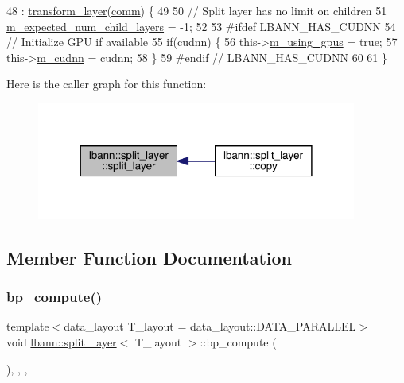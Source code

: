 \begin{DoxyCode}
48     : \hyperlink{classlbann_1_1transform__layer_a4b72501e0f4d0745c8b13c5331055e65}{transform\_layer}(\hyperlink{file__io_8cpp_ab048c6f9fcbcfaa57ce68b00263dbebe}{comm}) \{
49 
50     \textcolor{comment}{// Split layer has no limit on children}
51     \hyperlink{classlbann_1_1Layer_ac08f133dddd150319650e220ab9a523a}{m\_expected\_num\_child\_layers} = -1;
52 
53 \textcolor{preprocessor}{  #ifdef LBANN\_HAS\_CUDNN}
54     \textcolor{comment}{// Initialize GPU if available}
55     \textcolor{keywordflow}{if}(cudnn) \{
56       this->\hyperlink{classlbann_1_1Layer_af7881cb5eff5207c15fa835d65462e8f}{m\_using\_gpus} = \textcolor{keyword}{true};
57       this->\hyperlink{classlbann_1_1Layer_a08dbb94239e3b8c96329786c57c72e21}{m\_cudnn} = cudnn;
58     \}
59 \textcolor{preprocessor}{  #endif // LBANN\_HAS\_CUDNN}
60 
61   \}
\end{DoxyCode}
Here is the caller graph for this function\+:\nopagebreak
\begin{figure}[H]
\begin{center}
\leavevmode
\includegraphics[width=298pt]{classlbann_1_1split__layer_a875f1e07dd924826e7ec62e44f697c3e_icgraph}
\end{center}
\end{figure}


\subsection{Member Function Documentation}
\mbox{\label{classlbann_1_1split__layer_ae7b54dc12b2560d27f506d5f34c4074f}} 
\subsubsection{\texorpdfstring{bp\+\_\+compute()}{bp\_compute()}}
{\footnotesize\ttfamily template$<$data\+\_\+layout T\+\_\+layout = data\+\_\+layout\+::\+D\+A\+T\+A\+\_\+\+P\+A\+R\+A\+L\+L\+EL$>$ \\
void \hyperlink{classlbann_1_1split__layer}{lbann\+::split\+\_\+layer}$<$ T\+\_\+layout $>$\+::bp\+\_\+compute (\begin{DoxyParamCaption}{ }\end{DoxyParamCaption})\hspace{0.3cm}{\ttfamily [inline]}, {\ttfamily [override]}, {\ttfamily [protected]}, {\ttfamily [virtual]}}

